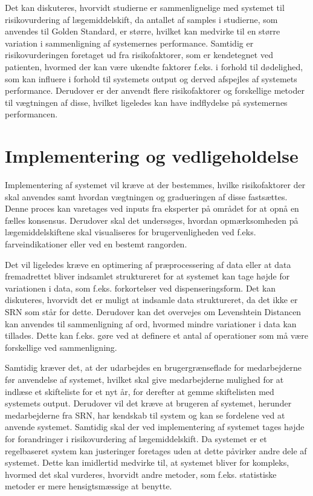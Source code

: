 Det kan diskuteres, hvorvidt studierne er sammenlignelige med systemet til risikovurdering af lægemiddelskift, da antallet af samples i studierne, som anvendes til Golden Standard,  er større, hvilket kan medvirke til en større variation i sammenligning af systemernes performance. Samtidig er risikovurderingen foretaget ud fra risikofaktorer, som er kendetegnet ved patienten, hvormed der kan være ukendte faktorer f.eks. i forhold til dødelighed, som kan influere i forhold til systemets output og derved afspejles af systemets performance. Derudover er der anvendt flere risikofaktorer og forskellige metoder til vægtningen af disse, hvilket ligeledes kan have indflydelse på systemernes performancen. 

\section{Implementering og vedligeholdelse}

Implementering af systemet vil kræve at der bestemmes, hvilke risikofaktorer der skal anvendes samt hvordan vægtningen og gradueringen af disse fastsættes. Denne proces kan varetages ved inputs fra eksperter på området for at opnå en fælles konsensus. Derudover skal det undersøges, hvordan opmærksomheden på lægemiddelskiftene skal visualiseres for brugervenligheden ved f.eks. farveindikationer eller ved en bestemt rangorden. 

Det vil ligeledes kræve en optimering af præprocessering af data eller at data fremadrettet bliver indsamlet struktureret for at systemet kan tage højde for variationen i data, som f.eks. forkortelser ved dispenseringsform. Det kan diskuteres, hvorvidt det er muligt at indsamle data struktureret, da det ikke er SRN som står for dette. Derudover kan det overvejes om Levenshtein Distancen kan anvendes til sammenligning af ord, hvormed mindre variationer i data kan tillades. Dette kan f.eks. gøre ved at definere et antal af operationer som må være forskellige ved sammenligning.

Samtidig kræver det, at der udarbejdes en brugergrænseflade for medarbejderne før anvendelse af systemet, hvilket skal give medarbejderne mulighed for at indlæse et skifteliste for et nyt år, for derefter at gemme skiftelisten med systemets output. Derudover vil det kræve at brugeren af systemet, herunder medarbejderne fra SRN, har kendskab til system og kan se fordelene ved at anvende systemet. Samtidig skal der ved implementering af systemet tages højde for forandringer i risikovurdering af lægemiddelskift. Da systemet er et regelbaseret system kan justeringer foretages uden at dette påvirker andre dele af systemet. Dette kan imidlertid medvirke til, at systemet bliver for kompleks, hvormed det skal vurderes, hvorvidt andre metoder, som f.eks. statistiske metoder er mere hensigtsmæssige at benytte.


